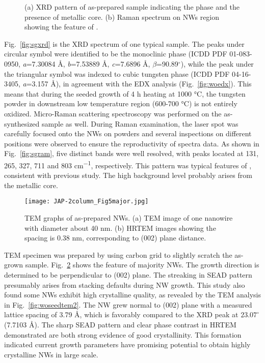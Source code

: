 \begin{figure}[htb]
\centering
{}\hspace{0.04\textwidth}
\caption[Characterization of seeded growth : XRD and Raman]{ (a) XRD pattern of as-prepared sample indicating the  phase and the presence of metallic core. (b) Raman spectrum on NWs region showing the feature of .}
\label{fig:woseedxrd}
\end{figure}

Fig.~\ref{fig:sgxrd} is the XRD spectrum of one typical sample. The peaks under circular symbol were identified to be the monoclinic  phase (ICDD PDF 01-083-0950, \emph{a}=7.30084 \AA, \emph{b}=7.53889 \AA, \emph{c}=7.6896 \AA, $\beta$=90.89$^\circ$), while the peak under the triangular symbol was indexed to cubic tungsten phase (ICDD PDF 04-16-3405, \emph{a}=3.157 \AA), in agreement with the EDX analysis (Fig.~\ref{fig:woedx}). This means that during the  seeded growth of 4 h heating at 1000 \si{\degreeCelsius}, the tungsten powder in downstream low temperature region (600-700 \si{\degreeCelsius}) is not entirely oxidized. Micro-Raman scattering spectroscopy was performed on the as-synthesized sample as well. During Raman examination, the laser spot was carefully focused onto the NWs on powders and several inspections on different positions were observed to ensure the reproductivity of spectra data. As shown in Fig.~\ref{fig:sgram}, five distinct bands were well resolved, with peaks located at 131, 265, 327, 711 and 803 \si{cm^{-1}}, respectively. This pattern was typical features of , consistent with previous study.\cite{Salje1975a,Dixit1986} The high background level probably arises from the metallic core.
\begin{figure}[htb]
\centering
\texttt{[image: JAP-2column\_Fig5major.jpg]}
\caption[Characterization of : TEM]{TEM graphs of as-prepared NWs. (a) TEM image of one nanowire with diameter about 40 nm. (b) HRTEM images showing the spacing is 0.38 nm, corresponding to (002) plane distance.}
\label{fig:woseedtem1}
\end{figure}

TEM specimen was prepared by using carbon grid to slightly scratch the as-grown sample. Fig.~\ref{fig:woseedtem1} shows the feature of majority NWs. The growth direction is determined to be perpendicular to (002) plane. The streaking in SEAD pattern presumably arises from stacking defaults during  NW growth. This study also found some NWs exhibit high crystalline quality, as revealed by the TEM analysis in Fig.~\ref{fig:woseedtem2}. The NW grew normal to (002) plane with a measured lattice spacing of 3.79 \AA, which is favorably compared to the XRD peak at $23.07^\circ$ (7.7103 \AA). The sharp SEAD pattern and clear phase contrast in HRTEM demonstrated are both strong evidence of good crystallinity. This formation indicated current growth parameters have promising potential to obtain highly crystalline  NWs in large scale. 

